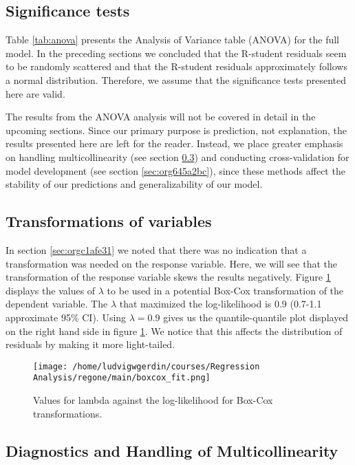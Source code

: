 \documentclass[11pt]{article}
\begin{document}
\subsection{Significance tests}
\label{sec:orga2dea07}

Table \ref{tab:anova} presents the Analysis of Variance table (ANOVA) for the full model. In the 
preceding sections we concluded that the R-student residuals seem to be randomly scattered and 
that the R-student residuals approximately follows a normal distribution. Therefore, we assume 
that the significance tests presented here are valid. 

The results from the ANOVA analysis will not be covered in detail in the upcoming sections. Since
our primary purpose is prediction, not explanation, the results presented here are left for the 
reader. Instead, we place greater emphasis on handling multicollinearity 
(see section \ref{sec:orgdc90973}) and conducting
cross-validation for model development (see section \ref{sec:org645a2bc}),
since these methods affect the stability of our predictions and generalizability of our model.



\subsection{Transformations of variables}
\label{sec:orgf7a94b9}

In section \ref{sec:orgc1afe31} we noted that there was no indication that a transformation was needed on the 
response variable. Here, we will see that the transformation of the response variable skews the results negatively.
Figure \ref{fig:orgf6e7426} displays the values of \(\lambda\) to be used in a potential Box-Cox transformation of 
the dependent variable. The \(\lambda\) that maximized the log-likelihood is 0.9 
(0.7-1.1 approximate 95\% CI). Using \(\lambda = 0.9\) gives us the quantile-quantile plot displayed on the 
right hand side in figure \ref{fig:orgf6e7426}. We notice that this affects the distribution of residuals by
making it more light-tailed. 

\begin{figure}[H]
\centering
\texttt{[image: /home/ludvigwgerdin/courses/Regression Analysis/regone/main/boxcox\_fit.png]}
\caption{\label{fig:orgf6e7426}
Values for lambda against the log-likelihood for Box-Cox transformations.}
\end{figure}

\subsection{Diagnostics and Handling of Multicollinearity}
\label{sec:orgdc90973}
\end{document}
